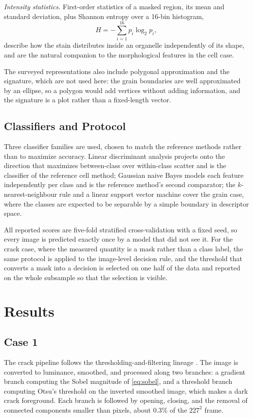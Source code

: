 \documentclass{ieeeaccess}
\begin{document}
\emph{Intensity statistics.} First-order statistics of a masked region, its mean
and standard deviation, plus Shannon entropy over a 16-bin histogram,
\begin{equation}
H=-\sum_{i=1}^{16}p_i\log_2 p_i ,
\label{eq:entropy}
\end{equation}
describe how the stain distributes inside an organelle independently of its
shape, and are the natural companion to the morphological features in the cell
case.

The surveyed representations also include polygonal approximation and the
signature, which are not used here: the grain boundaries are well approximated by
an ellipse, so a polygon would add vertices without adding information, and the
signature is a plot rather than a fixed-length vector.

\subsection{Classifiers and Protocol}
\label{sec:classifiers}
Three classifier families are used, chosen to match the reference methods rather
than to maximize accuracy. Linear discriminant analysis projects onto the
direction that maximizes between-class over within-class scatter and is the
classifier of the reference cell method; Gaussian naive Bayes models each feature
independently per class and is the reference method's second comparator; the
$k$-nearest-neighbour rule and a linear support vector machine cover the grain
case, where the classes are expected to be separable by a simple boundary in
descriptor space.

All reported scores are five-fold stratified cross-validation with a fixed seed,
so every image is predicted exactly once by a model that did not see it. For the
crack case, where the measured quantity is a mask rather than a class label, the
same protocol is applied to the image-level decision rule, and the threshold
that converts a mask into a decision is selected on one half of the data and
reported on the whole subsample so that the selection is visible.

\section{Results}
\label{sec:results}

\subsection{Case 1}
\label{sec:case1}
The crack pipeline follows the thresholding-and-filtering lineage
\cite{talab2016,mohan2018}. The image is converted to luminance, smoothed, and
processed along two branches: a gradient branch computing the Sobel magnitude of
\eqref{eq:sobel}, and a threshold branch computing Otsu's threshold on the
inverted smoothed image, which makes a dark crack foreground. Each branch is
followed by opening, closing, and the removal of connected components smaller
than \crackAreaPx{} pixels, about $0.3\%$ of the $227^2$ frame.
\end{document}
